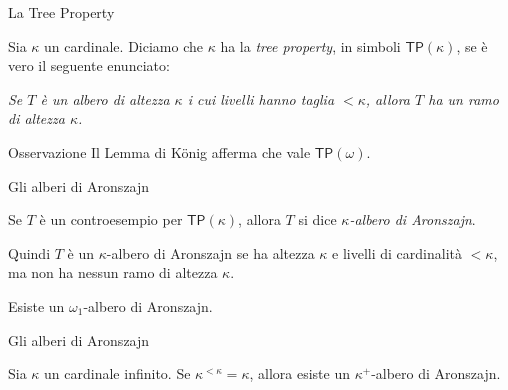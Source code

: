\documentclass{beamer}
\theoremstyle{num.custom-title}
\theoremstyle{custom-title}
\newcommand{\TP}{\ensuremath{\mathsf{TP}}\xspace}
\begin{document}
\begin{frame}{La Tree Property}

\vspace{5pt}


Sia $\kappa$ un cardinale. Diciamo che $\kappa$ ha la \emph{tree property}, in simboli $\TP(\kappa)$, se è vero il seguente enunciato:
\begin{center}
\textit{Se $T$ è un albero di altezza $\kappa$ i cui livelli hanno taglia $< \kappa$, allora $T$ ha un ramo di altezza $\kappa$.}
\end{center}

\pause

\begin{alertblock}{Osservazione}
Il Lemma di König afferma che vale $\TP(\omega)$.
\end{alertblock}

\end{frame}


\begin{frame}{Gli alberi di Aronszajn}

\begin{definition}
Se $T$ è un controesempio per $\TP(\kappa)$, allora $T$ si dice \emph{$\kappa$-albero di Aronszajn}.
\end{definition}
Quindi $T$ è un $\kappa$-albero di Aronszajn se ha altezza $\kappa$ e livelli di cardinalità $< \kappa$, ma non ha nessun ramo di altezza $\kappa$.

\pause

\begin{theorem}[Aronszajn, 1934]
Esiste un $\omega_1$-albero di Aronszajn.
\end{theorem}

\end{frame}

\begin{frame}{Gli alberi di Aronszajn}

\begin{theorem}[Specker, 1949]
Sia $\kappa$ un cardinale infinito. Se $\kappa^{< \kappa} = \kappa$, allora esiste un $\kappa^+$-albero di Aronszajn.
\end{theorem}

\end{frame}
\end{document}
